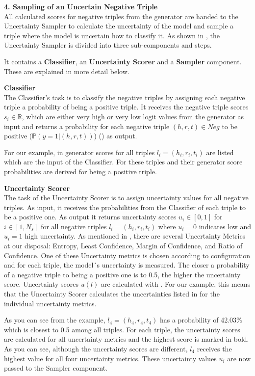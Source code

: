 \textbf{4. Sampling of an Uncertain Negative Triple}\\
%
All calculated scores for negative triples from the generator are handed to the Uncertainty Sampler to calculate the uncertainty of the model and sample a triple where the model is uncertain how to classify it.
As shown in , the Uncertainty Sampler is divided into three sub-components and steps.

It contains a \textbf{Classifier}, an \textbf{Uncertainty Scorer} and a \textbf{Sampler} component.
These are explained in more detail below.

\textbf{Classifier} \\
The Classifier's task is to classify the negative triples by assigning each negative triple a probability of being a positive triple.
It receives the negative triple scores $s_i \in \mathbb{R}$, which are either very high or very low logit values from the generator as input and returns a probability for each negative triple $(h,r,t) \in Neg$ to be positive  ($\mathbb{P}(y = 1| (h,r,t))$) () as output. 

For our example, in  generator scores for all triples $l_i = (h_i, r_i, t_i)$ are listed which are the input of the Classifier.
For these triples and their generator score probabilities are derived for being a positive triple.



\textbf{Uncertainty Scorer} \\
The task of the Uncertainty Scorer is to assign uncertainty values for all negative triples.
As input, it receives the probabilities from the Classifier of each triple to be a positive one.
As output it returns uncertainty scores $u_i \in [0,1]$ for $i \in [1, N_s]$ for all negative triples $l_i = (h_i, r_i, t_i)$ where $u_i = 0$ indicates low and $u_i = 1$ high uncertainty.
As mentioned in ,  there are several Uncertainty Metrics at our disposal:
Entropy, Least Confidence, Margin of Confidence, and Ratio of Confidence.
One of these Uncertainty metrics is chosen according to configuration and for each triple, the model´s uncertainty is measured.
The closer a probability of a negative triple to being a positive one is to 0.5, the higher the uncertainty score. 
Uncertainty scores $u(l)$ are calculated with .
For our example, this means that the Uncertainty Scorer calculates the uncertainties listed in  for the individual uncertainty metrics.

As you can see from the example, $l_4 = (h_4, r_4, t_4)$ has a probability of 42.03\% which is closest to 0.5 among all triples.
For each triple, the uncertainty scores are calculated for all uncertainty metrics and the highest score is marked in bold.
As you can see, although the uncertainty scores are different, $l_4$ receives the highest value for all four uncertainty metrics.
These uncertainty values $u_i$ are now passed to the Sampler component.


